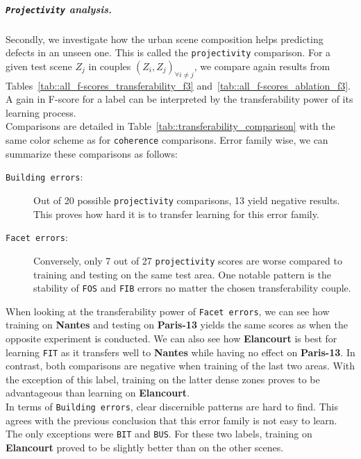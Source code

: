         \subparagraph{\texttt{Projectivity} analysis.}
            Secondly, we investigate how the urban scene composition helps predicting defects in an unseen one.
            This is called the \texttt{projectivity} comparison.
            For a given test scene $Z_j$ in couples $(Z_i, Z_j)_{\forall i \neq j}$, we compare again results from Tables~\ref{tab::all_f-scores_transferability_f3} and~\ref{tab::all_f-scores_ablation_f3}.
            A gain in F-score for a label can be interpreted by the transferability power of its learning process.\\

            Comparisons are detailed in Table~\ref{tab::transferability_comparison} with the same color scheme as for \texttt{coherence} comparisons.
            Error family wise, we can summarize these comparisons as follows:
            \begin{description}
                \item[\texttt{Building errors}:] Out of 20 possible \texttt{projectivity} comparisons, 13 yield negative results.
                        This proves how hard it is to transfer learning for this error family.
                \item[\texttt{Facet errors}:] Conversely, only 7 out of 27 \texttt{projectivity} scores are worse compared to training and testing on the same test area.
                        One notable pattern is the stability of \texttt{FOS} and \texttt{FIB} errors no matter the chosen transferability couple.
            \end{description}

            When looking at the transferability power of \texttt{Facet errors}, we can see how training on \textbf{Nantes} and testing on \textbf{Paris-13} yields the same scores as when the opposite experiment is conducted.
            We can also see how \textbf{Elancourt} is best for learning \texttt{FIT} as it transfers well to \textbf{Nantes} while having no effect on \textbf{Paris-13}.
            In contrast, both comparisons are negative when training of the last two areas.
            With the exception of this label, training on the latter dense zones proves to be advantageous than learning on \textbf{Elancourt}.\\
            In terms of \texttt{Building errors}, clear discernible patterns are hard to find.
            This agrees with the previous conclusion that this error family is not easy to learn.
            The only exceptions were \texttt{BIT} and \texttt{BUS}.
            For these two labels, training on \textbf{Elancourt} proved to be slightly better than on the other scenes.

